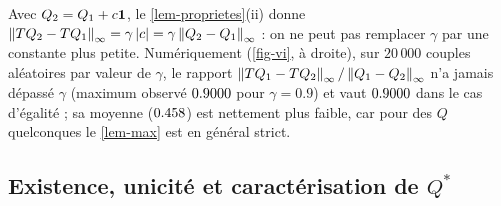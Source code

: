 \begin{remarque}
Avec $Q_2=Q_1+c\mathbf{1}$, le \cref{lem-proprietes}(ii) donne $\left\lVert TQ_2-TQ_1 \right\rVert_\infty=\gamma\left\lvert c \right\rvert=\gamma\left\lVert Q_2-Q_1 \right\rVert_\infty$ : on ne peut pas remplacer $\gamma$ par une constante plus petite. Numériquement (\cref{fig-vi}, à droite), sur $20\,000$ couples aléatoires par valeur de $\gamma$, le rapport $\left\lVert TQ_1-TQ_2 \right\rVert_\infty/\left\lVert Q_1-Q_2 \right\rVert_\infty$ n'a jamais dépassé $\gamma$ (maximum observé $0.9000$ pour $\gamma=0.9$) et vaut $0.9000$ dans le cas d'égalité ; sa moyenne ($0.458$) est nettement plus faible, car pour des $Q$ quelconques le \cref{lem-max} est en général strict.
\end{remarque}

\subsection{Existence, unicité et caractérisation de \texorpdfstring{$Q^*$}{Q*}}

